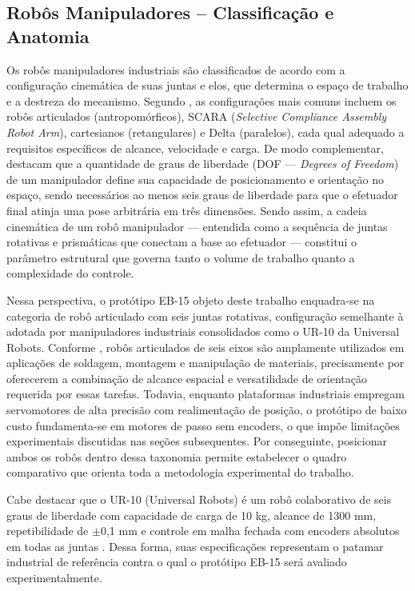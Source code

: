 \subsection{Robôs Manipuladores -- Classificação e Anatomia}

Os robôs manipuladores industriais são classificados de acordo com a configuração cinemática de suas juntas e elos, que determina o espaço de trabalho e a destreza do mecanismo. Segundo , as configurações mais comuns incluem os robôs articulados (antropomórficos), SCARA (\textit{Selective Compliance Assembly Robot Arm}), cartesianos (retangulares) e Delta (paralelos), cada qual adequado a requisitos específicos de alcance, velocidade e carga. De modo complementar,  destacam que a quantidade de graus de liberdade (DOF — \textit{Degrees of Freedom}) de um manipulador define sua capacidade de posicionamento e orientação no espaço, sendo necessários ao menos seis graus de liberdade para que o efetuador final atinja uma pose arbitrária em três dimensões. Sendo assim, a cadeia cinemática de um robô manipulador — entendida como a sequência de juntas rotativas e prismáticas que conectam a base ao efetuador — constitui o parâmetro estrutural que governa tanto o volume de trabalho quanto a complexidade do controle.

Nessa perspectiva, o protótipo EB-15 objeto deste trabalho enquadra-se na categoria de robô articulado com seis juntas rotativas, configuração semelhante à adotada por manipuladores industriais consolidados como o UR-10 da Universal Robots. Conforme , robôs articulados de seis eixos são amplamente utilizados em aplicações de soldagem, montagem e manipulação de materiais, precisamente por oferecerem a combinação de alcance espacial e versatilidade de orientação requerida por essas tarefas. Todavia, enquanto plataformas industriais empregam servomotores de alta precisão com realimentação de posição, o protótipo de baixo custo fundamenta-se em motores de passo sem encoders, o que impõe limitações experimentais discutidas nas seções subsequentes. Por conseguinte, posicionar ambos os robôs dentro dessa taxonomia permite estabelecer o quadro comparativo que orienta toda a metodologia experimental do trabalho.

Cabe destacar que o UR-10 (Universal Robots) é um robô colaborativo de seis graus de liberdade com capacidade de carga de 10 kg, alcance de 1300 mm, repetibilidade de $\pm$0,1 mm e controle em malha fechada com encoders absolutos em todas as juntas \cite{universalrobots2023}. Dessa forma, suas especificações representam o patamar industrial de referência contra o qual o protótipo EB-15 será avaliado experimentalmente.

